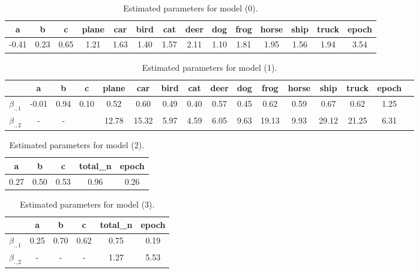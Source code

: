 \documentclass{article} %
\begin{document}
\begin{table}[h!]
    \centering
    \begin{tabular}{|c|c|c|c|c|c|c|c|c|c|c|c|c|c|}
        \hline
        a     & b    & c    & plane & car  & bird & cat  & deer & dog  & frog & horse & ship & truck & epoch \\
        \hline
        -0.41 & 0.23 & 0.65 &   1.21 & 1.63 &  1.40 & 1.57 &  2.11 & 1.10 &  1.81 &   1.95 &  1.56 &   1.94 &   3.54  \\
        \hline
    \end{tabular}
    \caption{Estimated parameters for model (0).}
    \label{table:cifar10_param_values_model_0}
\end{table}

\begin{table}[h!]
    \centering
\begin{tabular}{|l|c|c|c|c|c|c|c|c|c|c|c|c|c|c|c|}
\hline
     &     a &    b  &    c &  plane     &    car    &    bird   &  cat   &   deer     &  dog    &  frog     &  horse    &  ship &  truck    &  epoch  \\
\hline
$\beta_{.,1}$    & -0.01 & 0.94  & 0.10 &     0.52   &     0.60  &     0.49  &  0.40  &    0.57    &   0.45  &    0.62   &     0.59  &  0.67 &     0.62  &  1.25   \\
\hline
$\beta_{.,2}$     & -     & -     &      &     12.78  &   15.32   & 5.97      & 4.59   & 6.05       & 9.63    & 19.13     &   9.93    & 29.12 & 21.25     &  6.31  \\
\hline
\end{tabular}
\caption{Estimated parameters for model (1).}
\label{table:cifar10_param_values_model_1}
\end{table}


\begin{table}[h!]
    \centering
    \begin{tabular}{|c|c|c|c|c|}
        \hline
        a    & b    & c    & total\_n & epoch \\
        \hline
        0.27 & 0.50 & 0.53 &     0.96 &   0.26  \\
        \hline
    \end{tabular}
    \caption{Estimated parameters for model (2).}
    \label{table:cifar10_param_values_model_2}
\end{table}


\begin{table}[h!]
    \centering
    \begin{tabular}{|l|c|c|c|c|c|}
        \hline
            &    a  &    b  &    c &  total\_n &   epoch \\
        \hline
        $\beta_{.,1}$  & 0.25  & 0.70  & 0.62 &      0.75 &   0.19   \\
        \hline
        $\beta_{.,2}$   & -     & - & -  & 1.27      & 5.53 \\
        \hline
    \end{tabular}
    \caption{Estimated parameters for model (3).}
    \label{table:cifar10_param_values_model_3}
\end{table}
\end{document}
